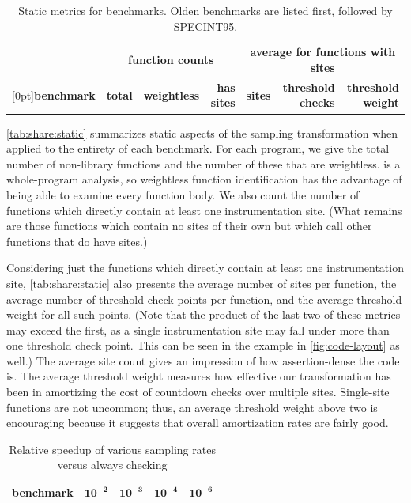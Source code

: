 \begin{table}[tb]
  \centering
  \small
  \begin{tabular}{|l|rrr|rrr|}
    \hline
    & \multicolumn{3}{c|}{\textbf{function counts}} & \multicolumn{3}{c|}{\textbf{average for functions with sites}} \\
    \raisebox{1.5ex}[0pt]{\textbf{benchmark}} & \textbf{total} & \textbf{weightless} & \textbf{has sites} & \textbf{sites} & \textbf{threshold checks} & \textbf{threshold weight} \\
    \hline\hline
    
    \hline
    
    \hline
  \end{tabular}
  \caption{Static metrics for \CCured benchmarks.  Olden benchmarks
    are listed first, followed by SPECINT95.}
  \label{tab:share:static}
\end{table}

\autoref{tab:share:static} summarizes static aspects of the sampling
transformation when applied to the entirety of each benchmark.  For
each program, we give the total number of non-library functions and
the number of these that are weightless.  \CCured is a whole-program
analysis, so weightless function identification has the advantage of
being able to examine every function body.  We also count the number
of functions which directly contain at least one instrumentation site.
(What remains are those functions which contain no sites of their own
but which call other functions that do have sites.)

Considering just the functions which directly contain at least one
instrumentation site, \autoref{tab:share:static} also presents the
average number of sites per function, the average number of threshold
check points per function, and the average threshold weight for all
such points.  (Note that the product of the last two of these metrics
may exceed the first, as a single instrumentation site may fall under
more than one threshold check point.  This can be seen in the example
in \autoref{fig:code-layout} as well.)  The average site count gives
an impression of how assertion-dense the code is.  The average
threshold weight measures how effective our transformation has been in
amortizing the cost of countdown checks over multiple sites.
Single-site functions are not uncommon; thus, an average threshold
weight above two is encouraging because it suggests that overall
amortization rates are fairly good.

\begin{table}
  \centering
  \begin{tabular}{|l|rrrr|}
    \hline
    \rule{0pt}{2.5ex}
    \textbf{benchmark} & $\mathbf{10^{-2}}$ & $\mathbf{10^{-3}}$ & $\mathbf{10^{-4}}$ & $\mathbf{10^{-6}}$ \\
    \hline\hline
    
    \hline
    
    \hline
  \end{tabular}
  \caption{Relative speedup of various sampling rates versus always checking}
  \label{tab:share:density}
\end{table}

